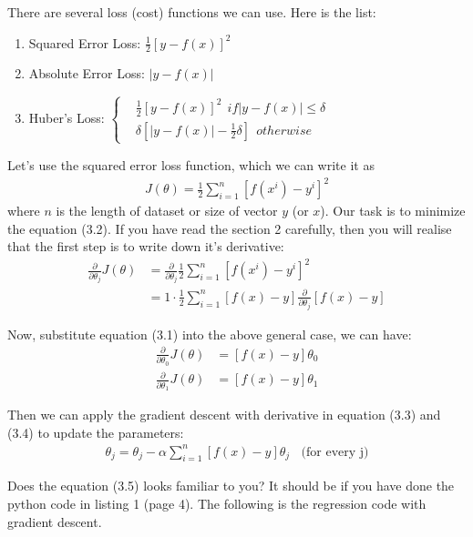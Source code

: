 \documentclass[12pt]{article}
\theoremstyle{definition}
\numberwithin{equation}{section}
\numberwithin{figure}{section}
\numberwithin{table}{section}
\begin{document}
There are several loss (cost) functions we can use. Here is the list:
\begin{enumerate}[label=(\roman*)]
  \item Squared Error Loss: $\frac{1}{2}[y - f(x)]^2$
  \item Absolute Error Loss: $|y - f(x)|$
  \item Huber's Loss: $\begin{cases}
    & \frac{1}{2}[y - f(x)]^2 \ \ if |y - f(x)| \leq \delta \\
    & \delta[|y - f(x)| - \frac{1}{2} \delta] \ \  otherwise
  \end{cases}$
\end{enumerate}

Let's use the squared error loss function, which we can write it as
\begin{align}
  J(\theta) = \frac{1}{2} \sum_{i=1}^n [f(x^i) - y^i]^2
\end{align}
where $n$ is the length of dataset or size of vector $y$ (or $x$). Our task is to minimize the equation (3.2). If you have read the section 2 carefully, then you will realise that the first step is to write down it's derivative:
\begin{align*}
  \frac{\partial }{\partial \theta_j} J(\theta)& = \frac{\partial }{\partial \theta_j} \frac{1}{2} \sum_{i=1}^n [f(x^i) - y^i]^2 \\
  & = 1 \cdot \frac{1}{2}\sum_{i=1}^n [f(x) - y] \frac{\partial }{\partial \theta_j}  [f(x) - y] \tag{chain rule}
\end{align*}

Now, substitute equation (3.1) into the above general case, we can have:
\begin{align}
  \frac{\partial }{\partial \theta_0} J(\theta)& = [f(x) - y] \theta_0 \\
  \frac{\partial }{\partial \theta_1} J(\theta)& = [f(x) - y] \theta_1
\end{align}

Then we can apply the gradient descent with derivative in equation (3.3) and (3.4) to update the parameters:
\begin{align}
  \theta_j = \theta_j - \alpha \sum_{i=1}^n [f(x) -y] \theta_j \ \ \ \ \text{(for every j)}
\end{align}

Does the equation (3.5) looks familiar to you? It should be if you have done the python code in listing 1 (page 4). The following is the regression code with gradient descent.
\end{document}

